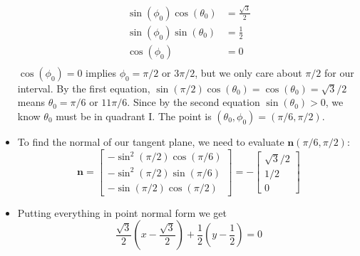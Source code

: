 \documentclass{article}
\begin{document}
\begin{itemize}
        \begin{align*}
            \sin(\phi_0)\cos(\theta_0) &= \frac{\sqrt{3}}{2}\\
            \sin(\phi_0)\sin(\theta_0) &= \frac{1}{2}\\
            \cos(\phi_0) &= 0\\
        \end{align*}
        $\cos(\phi_0) = 0$ implies $\phi_0 = \pi/2$ or $3\pi/2$, but we only care about $\pi/2$ for our interval. By the first equation, $\sin(\pi/2)\cos(\theta_0) = \cos(\theta_0) = \sqrt{3}/2$ means $\theta_0 = \pi/6$ or $11\pi/6$. Since by the second equation $\sin(\theta_0) > 0$, we know $\theta_0$ must be in quadrant I. The point is $(\theta_0, \phi_0)=(\pi/6, \pi/2)$.
        \item To find the normal of our tangent plane, we need to evaluate $\mathbf{n}(\pi/6, \pi/2)$:
        \[ 
        \mathbf{n}=
        \begin{bmatrix}
            -\sin^2(\pi/2)\cos(\pi/6)\\
            -\sin^2(\pi/2)\sin(\pi/6)\\
            -\sin(\pi/2)\cos(\pi/2)
        \end{bmatrix}=
        -\begin{bmatrix}
            \sqrt{3}/2\\1/2\\0
        \end{bmatrix}
        \]
        \item Putting everything in point normal form we get
        \[ \frac{\sqrt{3}}{2}(x-\frac{\sqrt{3}}{2}) + \frac{1}{2}(y-\frac{1}{2}) = 0 \]
    \end{itemize}
\end{document}
